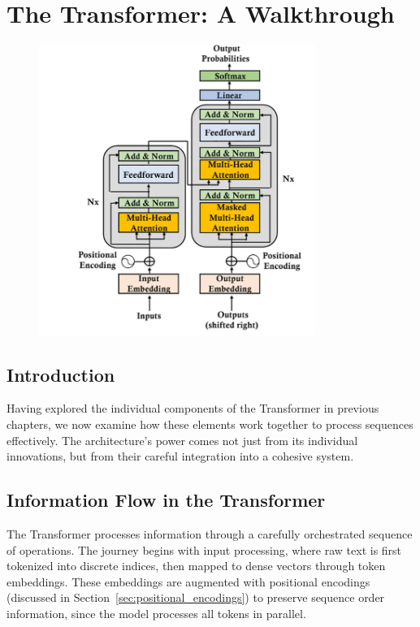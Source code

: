 \chapter{The Transformer: A Walkthrough}

\begin{figure}[h]
\begin{center}
    \includegraphics[width=0.8\textwidth]{images/transformer_arch.png}
    \end{center}
\end{figure}

\section{Introduction}
\noindent
Having explored the individual components of the Transformer in previous chapters, we now examine how these elements work together to process sequences effectively. The architecture's power comes not just from its individual innovations, but from their careful integration into a cohesive system.

\section{Information Flow in the Transformer}
\noindent
The Transformer processes information through a carefully orchestrated sequence of operations. The journey begins with input processing, where raw text is first tokenized into discrete indices, then mapped to dense vectors through token embeddings. These embeddings are augmented with positional encodings (discussed in Section~\ref{sec:positional_encodings}) to preserve sequence order information, since the model processes all tokens in parallel.

